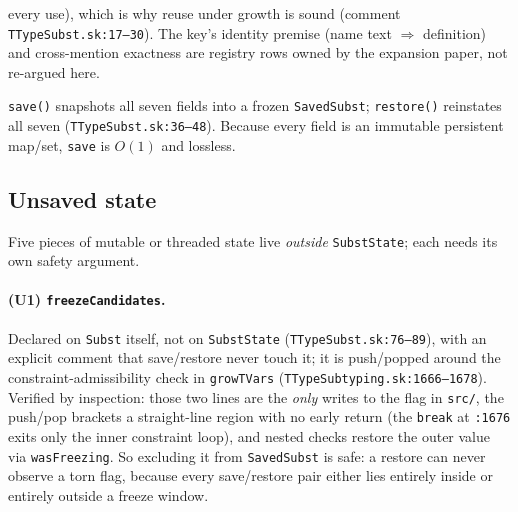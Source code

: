 \documentclass[11pt]{article}
\begin{document}
\begin{definition}
\begin{itemize}
\begin{itemize}
    every use), which is why reuse under growth is sound
    (comment \texttt{TTypeSubst.sk:17--30}). The key's identity premise
    (name text $\Rightarrow$ definition) and cross-mention exactness are
    registry rows owned by the expansion paper, not re-argued here.
  \end{itemize}
\end{itemize}
\texttt{save()} snapshots all seven fields into a frozen
\texttt{SavedSubst}; \texttt{restore()} reinstates all seven
(\texttt{TTypeSubst.sk:36--48}). Because every field is an immutable
persistent map/set, \texttt{save} is $O(1)$ and lossless.
\end{definition}

\subsection{Unsaved state}

Five pieces of mutable or threaded state live \emph{outside}
\texttt{SubstState}; each needs its own safety argument.

\paragraph{(U1) \texttt{freezeCandidates}.}
Declared on \texttt{Subst} itself, not on \texttt{SubstState}
(\texttt{TTypeSubst.sk:76--89}), with an explicit comment that
save/restore never touch it; it is push/popped around the
constraint-admissibility check in \texttt{growTVars}
(\texttt{TTypeSubtyping.sk:1666--1678}). Verified by inspection: those two
lines are the \emph{only} writes to the flag in \texttt{src/}, the
push/pop brackets a straight-line region with no early return (the
\texttt{break} at \texttt{:1676} exits only the inner constraint loop),
and nested checks restore the outer value via \texttt{wasFreezing}. So
excluding it from \texttt{SavedSubst} is safe: a restore can never observe
a torn flag, because every save/restore pair either lies entirely inside
or entirely outside a freeze window.
\end{document}
